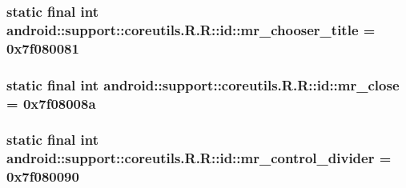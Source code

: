 \hypertarget{classandroid_1_1support_1_1coreutils_1_1_r_1_1id_f4571b509ab9b4cc1833beb75863f9df}{
\subsubsection[{mr\_\-chooser\_\-title}]{\setlength{\rightskip}{0pt plus 5cm}static final int android::support::coreutils.R.R::id::mr\_\-chooser\_\-title = 0x7f080081}}
\label{classandroid_1_1support_1_1coreutils_1_1_r_1_1id_f4571b509ab9b4cc1833beb75863f9df}


\hypertarget{classandroid_1_1support_1_1coreutils_1_1_r_1_1id_40e410dd741f3dfc204dc9a41efab37a}{
\subsubsection[{mr\_\-close}]{\setlength{\rightskip}{0pt plus 5cm}static final int android::support::coreutils.R.R::id::mr\_\-close = 0x7f08008a}}
\label{classandroid_1_1support_1_1coreutils_1_1_r_1_1id_40e410dd741f3dfc204dc9a41efab37a}


\hypertarget{classandroid_1_1support_1_1coreutils_1_1_r_1_1id_498416ed7c7ead2b2b94c4a6aed2d1ba}{
\subsubsection[{mr\_\-control\_\-divider}]{\setlength{\rightskip}{0pt plus 5cm}static final int android::support::coreutils.R.R::id::mr\_\-control\_\-divider = 0x7f080090}}
\label{classandroid_1_1support_1_1coreutils_1_1_r_1_1id_498416ed7c7ead2b2b94c4a6aed2d1ba}



